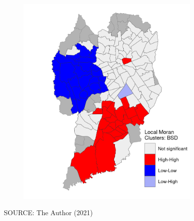 \begin{figure}[!htbp]
\begin{subfigure}{0.5\textwidth}
        \includegraphics{fig/lisa_BSD.png}
    \end{subfigure}    
    \label{fig:gwr_bsd}
    \par SOURCE: The Author (2021)
\end{figure}

